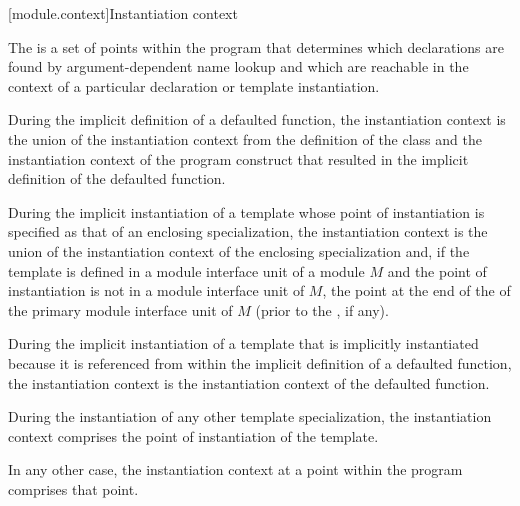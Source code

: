 [module.context]{Instantiation context}

\pnum
The  is a set of points within the program
that determines which declarations are found by
argument-dependent name lookup
and which are reachable
in the context of a particular declaration or template instantiation.

\pnum
During the implicit definition of
a defaulted function,
the instantiation context is the union of
the instantiation context from the definition of the class and
the instantiation context of the program construct that
resulted in the implicit definition of the defaulted function.

\pnum
During the implicit instantiation of a template
whose point of instantiation is specified as
that of an enclosing specialization,
the instantiation context is the union of
the instantiation context of the enclosing specialization and,
if the template is defined in a module interface unit of a module $M$
and the point of instantiation is not in a module interface unit of $M$,
the point at the end of the
 of the
primary module interface unit of $M$
(prior to the , if any).

\pnum
During the implicit instantiation of a template
that is implicitly instantiated because it is referenced
from within the implicit definition of a defaulted function,
the instantiation context is the instantiation context of
the defaulted function.

\pnum
During the instantiation of any other template specialization,
the instantiation context comprises the point of instantiation
of the template.

\pnum
In any other case, the instantiation context
at a point within the program
comprises that point.

